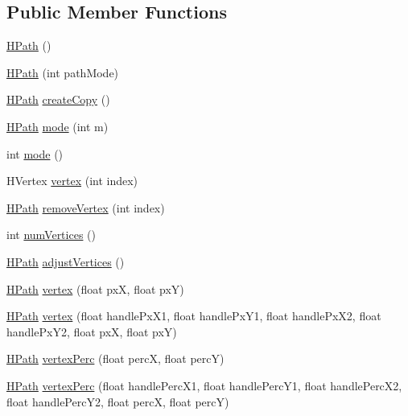 \subsection*{Public Member Functions}
\begin{DoxyCompactItemize}
\item 
\hyperlink{classhype_1_1drawable_1_1_h_path_a1701e5c6f61b12c155831d225622fe69}{H\-Path} ()
\item 
\hyperlink{classhype_1_1drawable_1_1_h_path_a4676c6d265941525f20e20b364fd1937}{H\-Path} (int path\-Mode)
\item 
\hyperlink{classhype_1_1drawable_1_1_h_path}{H\-Path} \hyperlink{classhype_1_1drawable_1_1_h_path_acaea5912d0931f3c3e12a6294e8ba283}{create\-Copy} ()
\item 
\hyperlink{classhype_1_1drawable_1_1_h_path}{H\-Path} \hyperlink{classhype_1_1drawable_1_1_h_path_a780a179a20abbbe2960b3c2a6663c741}{mode} (int m)
\item 
int \hyperlink{classhype_1_1drawable_1_1_h_path_a5660ce0ff6d511e224bf275cfeec8c48}{mode} ()
\item 
H\-Vertex \hyperlink{classhype_1_1drawable_1_1_h_path_a7e591bbf1f7a5b2d71425e07cd7f8771}{vertex} (int index)
\item 
\hyperlink{classhype_1_1drawable_1_1_h_path}{H\-Path} \hyperlink{classhype_1_1drawable_1_1_h_path_a65290bbef7be8e80f1384f884e781745}{remove\-Vertex} (int index)
\item 
int \hyperlink{classhype_1_1drawable_1_1_h_path_a841accc08946b6d260dc933eaea95867}{num\-Vertices} ()
\item 
\hyperlink{classhype_1_1drawable_1_1_h_path}{H\-Path} \hyperlink{classhype_1_1drawable_1_1_h_path_a840750edb4bf14e044168416eeabbb22}{adjust\-Vertices} ()
\item 
\hyperlink{classhype_1_1drawable_1_1_h_path}{H\-Path} \hyperlink{classhype_1_1drawable_1_1_h_path_af1af9ef7fd6c172ff05f4ebd42ef43f0}{vertex} (float px\-X, float px\-Y)
\item 
\hyperlink{classhype_1_1drawable_1_1_h_path}{H\-Path} \hyperlink{classhype_1_1drawable_1_1_h_path_aacc6d6046734ec6b64f03eaa333146c0}{vertex} (float handle\-Px\-X1, float handle\-Px\-Y1, float handle\-Px\-X2, float handle\-Px\-Y2, float px\-X, float px\-Y)
\item 
\hyperlink{classhype_1_1drawable_1_1_h_path}{H\-Path} \hyperlink{classhype_1_1drawable_1_1_h_path_ac5ea1af96c05276213cf2de7af9d7e20}{vertex\-Perc} (float perc\-X, float perc\-Y)
\item 
\hyperlink{classhype_1_1drawable_1_1_h_path}{H\-Path} \hyperlink{classhype_1_1drawable_1_1_h_path_a478a911f3547139618369efe3dc28b5d}{vertex\-Perc} (float handle\-Perc\-X1, float handle\-Perc\-Y1, float handle\-Perc\-X2, float handle\-Perc\-Y2, float perc\-X, float perc\-Y)

\end{DoxyCompactItemize}
